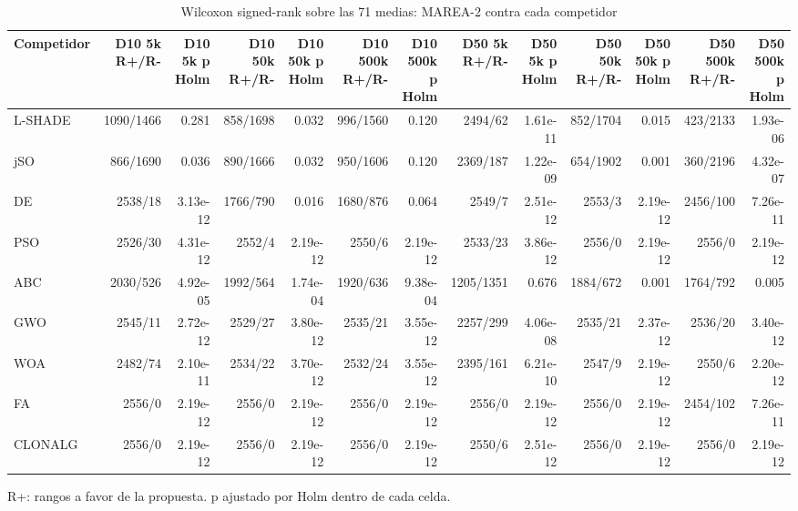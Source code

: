 \begin{table}[ht]\centering\small
\caption{Wilcoxon signed-rank sobre las 71 medias: MAREA-2 contra cada competidor}
\begin{tabular}{lrrrrrrrrrrrr}
\toprule
Competidor & D10 5k R+/R- & D10 5k p Holm & D10 50k R+/R- & D10 50k p Holm & D10 500k R+/R- & D10 500k p Holm & D50 5k R+/R- & D50 5k p Holm & D50 50k R+/R- & D50 50k p Holm & D50 500k R+/R- & D50 500k p Holm \\
\midrule
L-SHADE & 1090/1466 & 0.281 & 858/1698 & 0.032 & 996/1560 & 0.120 & 2494/62 & 1.61e-11 & 852/1704 & 0.015 & 423/2133 & 1.93e-06 \\
jSO & 866/1690 & 0.036 & 890/1666 & 0.032 & 950/1606 & 0.120 & 2369/187 & 1.22e-09 & 654/1902 & 0.001 & 360/2196 & 4.32e-07 \\
DE & 2538/18 & 3.13e-12 & 1766/790 & 0.016 & 1680/876 & 0.064 & 2549/7 & 2.51e-12 & 2553/3 & 2.19e-12 & 2456/100 & 7.26e-11 \\
PSO & 2526/30 & 4.31e-12 & 2552/4 & 2.19e-12 & 2550/6 & 2.19e-12 & 2533/23 & 3.86e-12 & 2556/0 & 2.19e-12 & 2556/0 & 2.19e-12 \\
ABC & 2030/526 & 4.92e-05 & 1992/564 & 1.74e-04 & 1920/636 & 9.38e-04 & 1205/1351 & 0.676 & 1884/672 & 0.001 & 1764/792 & 0.005 \\
GWO & 2545/11 & 2.72e-12 & 2529/27 & 3.80e-12 & 2535/21 & 3.55e-12 & 2257/299 & 4.06e-08 & 2535/21 & 2.37e-12 & 2536/20 & 3.40e-12 \\
WOA & 2482/74 & 2.10e-11 & 2534/22 & 3.70e-12 & 2532/24 & 3.55e-12 & 2395/161 & 6.21e-10 & 2547/9 & 2.19e-12 & 2550/6 & 2.20e-12 \\
FA & 2556/0 & 2.19e-12 & 2556/0 & 2.19e-12 & 2556/0 & 2.19e-12 & 2556/0 & 2.19e-12 & 2556/0 & 2.19e-12 & 2454/102 & 7.26e-11 \\
CLONALG & 2556/0 & 2.19e-12 & 2556/0 & 2.19e-12 & 2556/0 & 2.19e-12 & 2550/6 & 2.51e-12 & 2556/0 & 2.19e-12 & 2556/0 & 2.19e-12 \\
\bottomrule
\end{tabular}
\par\footnotesize R+: rangos a favor de la propuesta. p ajustado por Holm dentro de cada celda.
\end{table}
